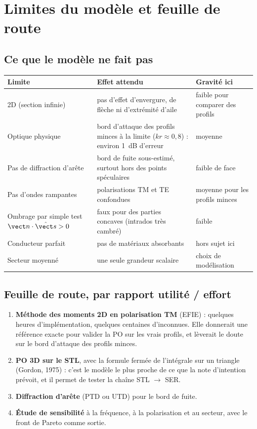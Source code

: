 \chapter{Limites du modèle et feuille de route}\label{ch:limites}

\section{Ce que le modèle ne fait pas}
\begin{center}
\renewcommand{\arraystretch}{1.2}
\begin{tabularx}{\linewidth}{lXl}
\toprule
Limite & Effet attendu & Gravité ici \\
\midrule
2D (section infinie) & pas d'effet d'envergure, de flèche ni d'extrémité d'aile & faible pour comparer des profils \\
Optique physique & bord d'attaque des profils minces à la limite ($kr\approx0{,}8$) : environ 1~dB d'erreur & moyenne \\
Pas de diffraction d'arête & bord de fuite sous-estimé, surtout hors des points spéculaires & faible de face \\
Pas d'ondes rampantes & polarisations TM et TE confondues & moyenne pour les profils minces \\
Ombrage par simple test $\vect n\cdot\shat>0$ & faux pour des parties concaves (intrados très cambré) & faible \\
Conducteur parfait & pas de matériaux absorbants & hors sujet ici \\
Secteur moyenné & une seule grandeur scalaire & choix de modélisation \\
\bottomrule
\end{tabularx}
\end{center}

\section{Feuille de route, par rapport utilité / effort}
\begin{enumerate}
\item \textbf{Méthode des moments 2D en polarisation TM} (EFIE) : quelques heures d'implémentation, quelques centaines d'inconnues. Elle donnerait une référence exacte pour valider la PO sur les vrais profils, et lèverait le doute sur le bord d'attaque des profils minces.
\item \textbf{PO 3D sur le STL}, avec la formule fermée de l'intégrale sur un triangle (Gordon, 1975) : c'est le modèle le plus proche de ce que la note d'intention prévoit, et il permet de tester la chaîne STL $\to$ SER.
\item \textbf{Diffraction d'arête} (PTD ou UTD) pour le bord de fuite.
\item \textbf{Étude de sensibilité} à la fréquence, à la polarisation et au secteur, avec le front de Pareto comme sortie.
\end{enumerate}


